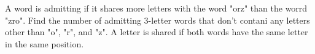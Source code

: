 A word is admitting if it shares more letters with the word "orz" than the worrd "zro". Find the number of admitting 3-letter words that don't contani any letters other than "o", "r", and "z". A letter is shared if both words have the same letter in the same position.
